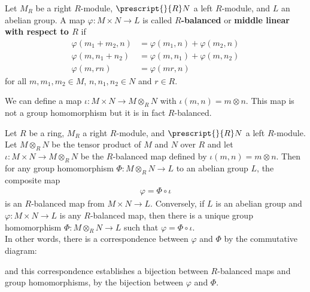 \documentclass{memoir}
\begin{document}
\begin{defn}
	Let \(M_R\) be a right \(R\)-module, \(\prescript{}{R}N\) a left \(R\)-module, and \(L\) an abelian group. A map \(\varphi :M\times N \to L\) is called \textbf{\(R\)-balanced} or \textbf{middle linear with respect to \(R\)} if
	\begin{align*}
		\varphi (m_1+m_2,n) &= \varphi(m_1,n) + \varphi (m_2,n)\\
		\varphi (m,n_1+n_2) &= \varphi (m,n_1) + \varphi (m,n_2)\\
		\varphi (m,rn) &= \varphi (mr,n)
	\end{align*}
	for all \(m,m_1,m_2 \in M\), \(n,n_1,n_2 \in N\) and \(r \in R\).
\end{defn}
We can define a map \(\iota:M\times N \to M \otimes_R N\) with \(\iota(m,n) = m \otimes n\). This map is not a group homomorphism but it is in fact \(R\)-balanced.

\begin{thm}
	Let \(R\) be a ring, \(M_R\) a right \(R\)-module, and \(\prescript{}{R}N\) a left \(R\)-module. Let \(M \otimes_R N\) be the tensor product of \(M\) and \(N\) over \(R\) and let \(\iota: M \times N \to M \otimes_R N\) be the \(R\)-balanced map defined by \(\iota(m,n) = m \otimes n\). Then for any group homomorphism \(\Phi :M \otimes_R N \to L\) to an abelian group \(L\), the composite map
	\begin{align*}
		\varphi = \Phi \circ \iota
	\end{align*}
	is an \(R\)-balanced map from \(M \times N \to L\). Conversely, if \(L\) is an abelian group and \(\varphi :M \times N \to L\) is any \(R\)-balanced map, then there is a unique group homomorphism \(\Phi: M \otimes_R N \to L\) such that \(\varphi  = \Phi \circ \iota\).\\

	In other words, there is a correspondence between \(\varphi \) and \(\Phi \) by the commutative diagram:
\begin{center}
\end{center}
and this correspondence establishes a bijection between \(R\)-balanced maps and group homomorphisms, by the bijection between \(\varphi \) and \(\Phi \).
\end{thm}
\end{document}

